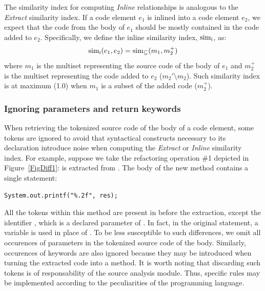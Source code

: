 The similarity index for computing \textit{Inline} relationships is analogous to the \textit{Extract} similarity index.
If a code element $e_1$ is inlined into a code element $e_2$, we expect that the code from the body of $e_1$ should be mostly contained in the code added to $e_2$. Specifically, we define the inline similarity index, $\operatorname{sim_{i}}$, as:
\begin{align}
\operatorname{sim_{i}}(e_1, e_2) = \operatorname{sim_{\subseteq}}(m_1, m_2^+)
\end{align}
where $m_1$ is the multiset representing the source code of the body of $e_1$ and $m_2^+$ is the multiset representing the code added to $e_2$ ($m_2' \setminus m_2$). Such similarity index is at maximum (1.0) when $m_1$ is a subset of the added code ($m_2^+$).





\subsubsection{Ignoring parameters and return keywords}

When retrieving the tokenized source code of the body of a code element, some tokens are ignored to avoid that syntactical constructs necessary to its declaration
introduce noise when computing the \textit{Extract} or \textit{Inline} similarity index.
For example, suppose we take the refactoring operation \#1 depicted in Figure~\ref{FigDiff1}:  is extracted from .
The body of the new method  contains a single statement:
\begin{lstlisting}
System.out.printf("%.2f", res);
\end{lstlisting}
All the tokens within this method are present in  before the extraction, except the identifier , which is a declared parameter of . In fact, in the original statement, a variable  is used in place of . To be less susceptible to such differences, we omit all occurences of parameters in the tokenized source code of the body. Similarly, occurences of  keywords are also ignored because they may be introduced when turning the extracted code into a method.
It is worth noting that discarding such tokens is of responsability of the source analysis module. Thus, specific rules may be implemented according to the peculiarities of the programming language.

